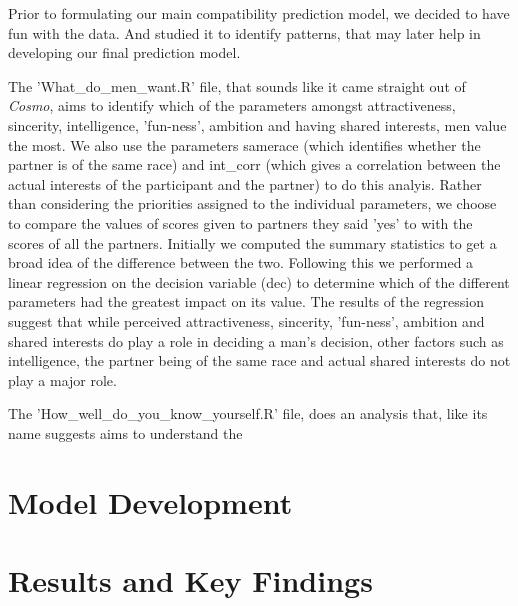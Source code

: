 \documentclass{article}
\begin{document}
Prior to formulating our main compatibility prediction model, we decided to have fun with the data. And studied it to identify patterns, that may later help in developing our final prediction model. 

The 'What_do_men_want.R' file, that sounds like it came straight out of \textit{Cosmo}, aims to identify which of the parameters amongst attractiveness, sincerity, intelligence, 'fun-ness', ambition and having shared interests, men value the most. We also use the parameters samerace (which identifies whether the partner is of the same race) and int_corr (which gives a correlation between the actual interests of the participant and the partner) to do this analyis. Rather than considering the priorities assigned to the individual parameters, we choose to compare the values of scores given to partners they said 'yes' to with the scores of all the partners. Initially we computed the summary statistics to get a broad idea of the difference between the two. Following this we performed a linear regression on the decision variable (dec) to determine which of the different parameters had the greatest impact on its value. The results of the regression suggest that while perceived attractiveness, sincerity, 'fun-ness', ambition and shared interests do play a role in deciding a man's decision, other factors such as intelligence, the partner being of the same race and actual shared interests do not play a major role.

The 'How_well_do_you_know_yourself.R' file, does an analysis that, like its name suggests aims to understand the 

 
\section{Model Development}
 
\section{Results and Key Findings}
\end{document}
